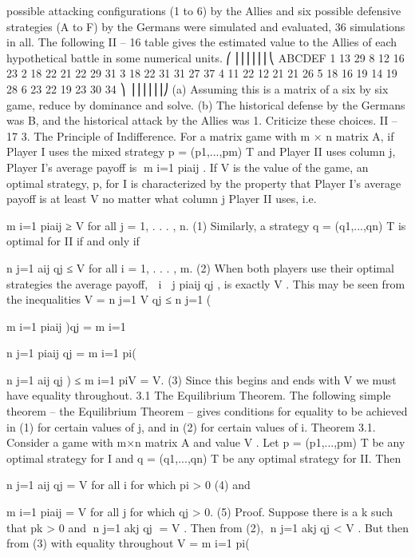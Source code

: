 possible attacking configurations (1 to 6) by the Allies and six possible defensive strategies
(A to F) by the Germans were simulated and evaluated, 36 simulations in all. The following
II – 16
table gives the estimated value to the Allies of each hypothetical battle in some numerical
units.
⎛
⎜⎜⎜⎜⎜⎜⎝
ABCDEF
1 13 29 8 12 16 23
2 18 22 21 22 29 31
3 18 22 31 31 27 37
4 11 22 12 21 21 26
5 18 16 19 14 19 28
6 23 22 19 23 30 34
⎞
⎟⎟⎟⎟⎟⎟⎠
(a) Assuming this is a matrix of a six by six game, reduce by dominance and solve.
(b) The historical defense by the Germans was B, and the historical attack by the Allies
was 1. Criticize these choices.
II – 17
3. The Principle of Indifference.
For a matrix game with m × n matrix A, if Player I uses the mixed strategy p =
(p1,...,pm)
T and Player II uses column j, Player I’s average payoff is m
i=1 piaij . If V is
the value of the game, an optimal strategy, p, for I is characterized by the property that
Player I’s average payoff is at least V no matter what column j Player II uses, i.e.

m
i=1
piaij ≥ V for all j = 1, . . . , n. (1)
Similarly, a strategy q = (q1,...,qn)
T is optimal for II if and only if

n
j=1
aij qj ≤ V for all i = 1, . . . , m. (2)
When both players use their optimal strategies the average payoff, 
i

j piaij qj , is exactly
V . This may be seen from the inequalities
V = 
n
j=1
V qj ≤ 
n
j=1
(

m
i=1
piaij )qj = 
m
i=1

n
j=1
piaij qj
= 
m
i=1
pi(

n
j=1
aij qj ) ≤ 
m
i=1
piV = V.
(3)
Since this begins and ends with V we must have equality throughout.
3.1 The Equilibrium Theorem. The following simple theorem – the Equilibrium
Theorem – gives conditions for equality to be achieved in (1) for certain values of j, and
in (2) for certain values of i.
Theorem 3.1. Consider a game with m×n matrix A and value V . Let p = (p1,...,pm)
T
be any optimal strategy for I and q = (q1,...,qn)
T be any optimal strategy for II. Then

n
j=1
aij qj = V for all i for which pi > 0 (4)
and

m
i=1
piaij = V for all j for which qj > 0. (5)
Proof. Suppose there is a k such that pk > 0 and n
j=1 akj qj = V . Then from (2),
n
j=1 akj qj < V . But then from (3) with equality throughout
V = 
m
i=1
pi(

